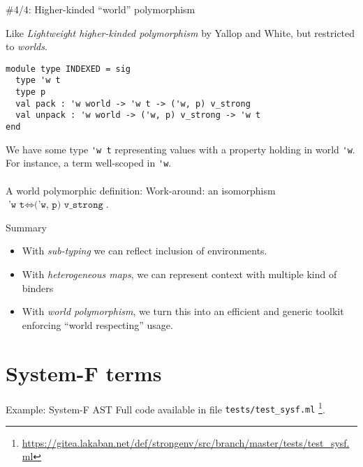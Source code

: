 \documentclass{beamer}          %
\begin{document}
\begin{frame}[fragile]{\#4/4: Higher-kinded ``world'' polymorphism}

Like {\em Lightweight higher-kinded polymorphism} by Yallop and White, but restricted to {\em worlds}.
\begin{lstlisting}
module type INDEXED = sig
  type 'w t
  type p
  val pack : 'w world -> 'w t -> ('w, p) v_strong
  val unpack : 'w world -> ('w, p) v_strong -> 'w t
end
\end{lstlisting}

We have some type \lstinline{'w t} representing values with a property holding in world
\lstinline{'w}. For instance, a term well-scoped in \lstinline{'w}. \\
\pause ~ \\
A world polymorphic definition:
\pause
Work-around: an isomorphism $\texttt{'w t} \Leftrightarrow \texttt{('w, p) v\_strong}$. \\
\end{frame}

\begin{frame}{Summary}
  \begin{itemize}
    \item With {\em sub-typing} we can reflect inclusion of environments.
    \item With {\em heterogeneous maps}, we can represent context with multiple kind
          of binders
    \item With {\em world polymorphism}, we turn this into an efficient and
          generic toolkit enforcing ``world respecting'' usage.
  \end{itemize}
\end{frame}

\section{System-F terms}

\begin{frame}{Example: System-F AST}
  Full code available in file {\tt tests/test\_sysf.ml}
  \footnote{\url{https://gitea.lakaban.net/def/strongenv/src/branch/master/tests/test_sysf.ml}}.

\end{frame}
\end{document}
